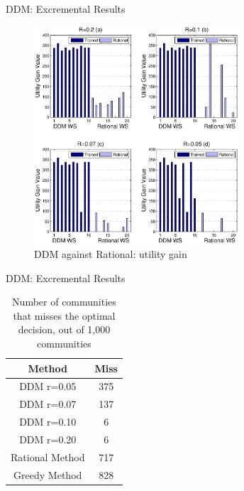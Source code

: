 \documentclass{beamer}
\begin{document}
\begin{frame}{DDM: Excremental Results}
    \begin{figure}[htbp]
    \centering
    \includegraphics[width=3in]{figures/utility_gain.eps}
    \caption{DDM against Rational: utility gain }
    \label{utility_gain_mlisa_and_rational}
    \end{figure}
\end{frame}
\begin{frame}{DDM: Excremental Results}
    \begin{table}[ht]
        \caption{Number of communities that misses the optimal decision, out of 1,000 communities} %
        \centering %
        \begin{tabular}{|c|c|} %
        \hline %
         Method&Miss \\ [0.5ex] %
        \hline %
         DDM r=0.05& 375 \\ %
         DDM r=0.07& 137 \\
         DDM r=0.10& 6 \\
         DDM r=0.20& 6 \\
        Rational Method& 717 \\
        Greedy Method& 828 \\ [1ex] %
        \hline %
        \end{tabular}
        \label{fail_rate} %
    \end{table}
\end{frame}
\end{document}
